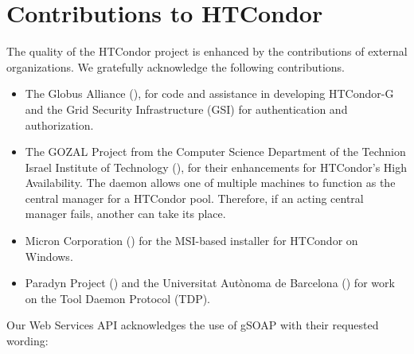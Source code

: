 \section{\label{sec:contributions}Contributions to HTCondor}

The quality of the HTCondor project is enhanced by the contributions
of external organizations.
We gratefully acknowledge the following contributions. 

\begin{itemize}

\item{The Globus Alliance} (), 
for code and assistance in developing HTCondor-G
and the Grid Security Infrastructure (GSI)
for authentication and authorization. 

\item{The GOZAL Project}
from the Computer Science Department
of the Technion Israel Institute of Technology
(),
for their enhancements for HTCondor's High Availability.
The  daemon allows one of multiple machines to function
as the central manager for a HTCondor pool.
Therefore, if an acting central manager fails,
another can take its place.


\item{Micron Corporation} ()
for the MSI-based installer for HTCondor on Windows.

\item{Paradyn Project} ()
and the Universitat Aut\`{o}noma de Barcelona
() for work on the Tool Daemon Protocol (TDP).

\end{itemize}

Our Web Services API acknowledges the use of gSOAP with their
requested wording:

